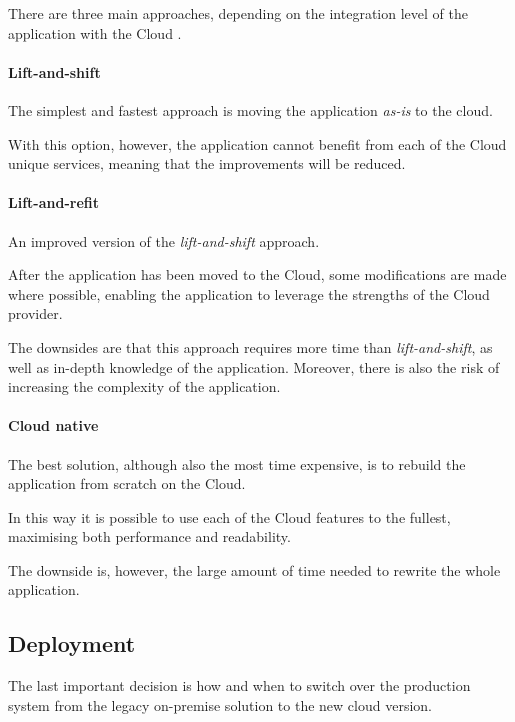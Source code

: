     There are three main approaches, depending on the integration level of the application with the Cloud \cite{bib:related_work:migration:moving_to_cloud, bib:related_work:migration:10_steps}.
    
    \paragraph{Lift-and-shift}
        The simplest and fastest approach is moving the application \textit{as-is} to the cloud.
        
        With this option, however, the application cannot benefit from each of the Cloud unique services, meaning that the improvements will be reduced.
        
    \paragraph{Lift-and-refit}
        An improved version of the \textit{lift-and-shift} approach.
    
        After the application has been moved to the Cloud, some modifications are made where possible, enabling the application to leverage the strengths of the Cloud provider.
        
        The downsides are that this approach requires more time than \textit{lift-and-shift}, as well as in-depth knowledge of the application.
        Moreover, there is also the risk of increasing the complexity of the application.
        
    \paragraph{Cloud native}
        The best solution, although also the most time expensive, is to rebuild the application from scratch on the Cloud.
        
        In this way it is possible to use each of the Cloud features to the fullest, maximising both performance and readability.
        
        The downside is, however, the large amount of time needed to rewrite the whole application.
        
\subsection{Deployment}
    The last important decision is how and when to switch over the production system from the legacy on-premise solution to the new cloud version.
    
